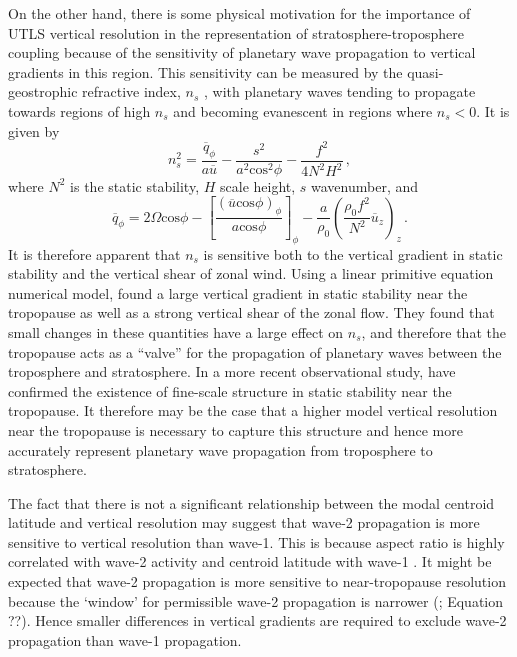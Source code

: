 On the other hand, there is some physical motivation for the importance of UTLS
vertical resolution in the representation of stratosphere-troposphere coupling
because of the sensitivity of planetary wave propagation to vertical gradients
in this region. This sensitivity can be measured by the quasi-geostrophic
refractive index, $n_{s}$ \citep{Matsuno1970}, with planetary waves tending to
propagate towards regions of high $n_{s}$ and becoming evanescent in regions
where $n_{s}<0$. It is given by
\begin{equation}
  n_{s}^{2} = \frac{\overline{q}_{\phi}}{a\overline{u}} -
  \frac{s^{2}}{a^{2}\mathrm{cos}^{2}\phi} - \frac{f^{2}}{4N^{2}H^{2}} \, ,
\end{equation}
where $N^{2}$ is the static stability, $H$ scale height, $s$ wavenumber, and
\begin{equation}
  \overline{q}_{\phi} = 2\Omega\mathrm{cos}\phi - \left[
    \frac{(\overline{u}\mathrm{cos}\phi)_{\phi}}{a\mathrm{cos}\phi} \right]_{\phi} -
  \frac{a}{\rho_{0}}\left(\frac{\rho_{0}f^{2}}{N^{2}}\overline{u}_{z}\right)_{z}
  \, .
\end{equation}
It is therefore apparent that $n_{s}$ is sensitive both to the vertical
gradient in static stability and the vertical shear of zonal wind. Using a
linear primitive equation numerical model, \citet{Chen1992} found a large
vertical gradient in static stability near the tropopause as well as a strong
vertical shear of the zonal flow. They found that small changes in these
quantities have a large effect on $n_{s}$, and therefore that the tropopause
acts as a ``valve'' for the propagation of planetary waves between the
troposphere and stratosphere. In a more recent observational study,
\citet{Grise2010} have confirmed the existence of fine-scale structure in static
stability near the tropopause. It therefore may be the case that a higher model
vertical resolution near the tropopause is necessary to capture this structure
and hence more accurately represent planetary wave propagation from troposphere
to stratosphere. 

The fact that there is not a significant relationship between the modal centroid
latitude and vertical resolution may suggest that wave-2 propagation is more
sensitive to vertical resolution than wave-1. This is because aspect ratio is
highly correlated with wave-2 activity and centroid latitude with wave-1
\citep{Waugh1999}. It might be expected that wave-2 propagation is more
sensitive to near-tropopause resolution because the `window' for permissible
wave-2 propagation is narrower (\citet{Charney1961}; Equation ??). Hence
smaller differences in vertical gradients are required to exclude wave-2
propagation than wave-1 propagation.

